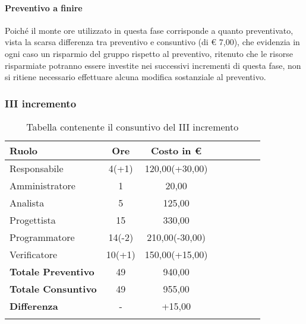 \paragraph{Preventivo a finire}
Poiché il monte ore utilizzato in questa fase corrisponde a quanto preventivato, vista la scarsa differenza tra preventivo e consuntivo (di € 7,00), che evidenzia in ogni caso un risparmio del gruppo rispetto al preventivo, ritenuto che le risorse risparmiate potranno essere investite nei successivi incrementi di questa fase, non si ritiene necessario effettuare alcuna modifica sostanziale al preventivo.
\newpage
\subsubsection{III incremento}\label{_consuntivoPoC3}
\begin{longtable}{|l|c|c|c|c|c|c|c|}
	\hline
	\rowcolor{lighter-grayer}
	\textbf{Ruolo}             & \textbf{Ore} & \textbf{Costo in €} \\
	\hline
	\endfirsthead

	\hline
	Responsabile               & 4(+1)           & 120,00(+30,00)              \\
	\hline
	\hline
	Amministratore             & 1       & 20,00      \\
	\hline
	\hline
	Analista                   & 5       & 125,00   \\
	\hline
	\hline
	Progettista                & 15            & 330,00              \\
	\hline
	\hline
	Programmatore              & 14(-2)            & 210,00(-30,00)                   \\
	\hline
	\hline
	Verificatore               & 10(+1)       & 150,00(+15,00)    \\
	\hline
	\textbf{Totale Preventivo} & 49          & 940,00            \\
	\hline
	\hline
	\textbf{Totale Consuntivo} & 49          & 955,00            \\
	\hline
	\hline
	\textbf{Differenza}        & -           & +15,00           \\
	\hline
	\rowcolor{white}
	\caption{Tabella contenente il consuntivo del III incremento}
\end{longtable}
